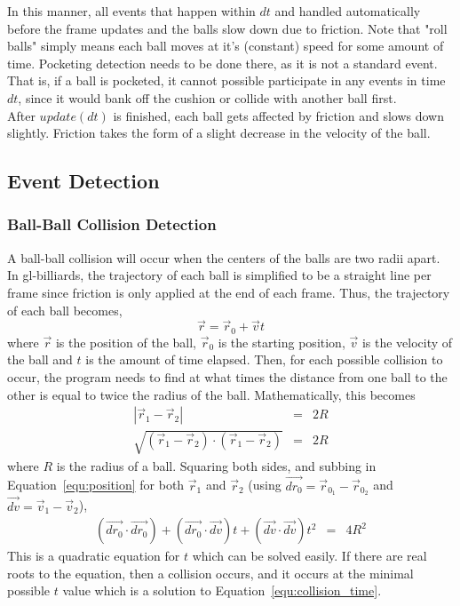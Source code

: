     In this manner, all events that happen within $dt$ and handled automatically before the frame updates and the balls slow
    down due to friction. Note that "roll balls" simply means each ball moves at it's (constant) speed for some amount of time. Pocketing
    detection needs to be done there, as it is not a standard event. That is, if a ball is pocketed, it cannot possible participate
    in any events in time $dt$, since it would bank off the cushion or collide with another ball first. \\
    After $update(dt)$ is finished, each ball gets affected by friction and slows down slightly. Friction takes the form of a
    slight decrease in the velocity of the ball. 
    
    \subsection{Event Detection}
        \subsubsection{Ball-Ball Collision Detection}
        A ball-ball collision will occur when the centers of the balls are two radii apart. In gl-billiards, the trajectory
        of each ball is simplified to be a straight line per frame since friction is only applied at the end of each frame.
        Thus, the trajectory of each ball becomes,
        \begin{equation}
            \vec r = \vec r_0 + \vec v t
            \label{equ:position}
        \end{equation}
        where $\vec r$ is the position of the ball, $\vec r_0$ is the starting position, $\vec v$ is the velocity of the ball and
        $t$ is the amount of time elapsed. Then, for each possible collision to occur, the program needs to find at what times the
        distance from one ball to the other is equal to twice the radius of the ball. Mathematically, this becomes
        \begin{eqnarray}
            | \vec r_1 - \vec r_2 | &=& 2 R   \nonumber   \\
            \sqrt{ (\vec r_1 - \vec r_2) \cdot (\vec r_1 - \vec r_2) } &=& 2 R  \nonumber
        \end{eqnarray}
        where $R$ is the radius of a ball. Squaring both sides, and subbing in Equation~\ref{equ:position} for both
        $\vec r_1$ and $\vec r_2$ (using $\vec{dr_0} = \vec r_{0_1} - \vec r_{0_2}$ and $\vec{dv} = \vec v_1 - \vec v_2$),
        \begin{eqnarray}
            (\vec{dr_0} \cdot \vec{dr_0}) + (\vec{dr_0} \cdot \vec{dv}) t + (\vec{dv} \cdot \vec{dv}) t^2 &=& 4 R^2
            \label{equ:collision_time}
        \end{eqnarray}
        This is a quadratic equation for $t$ which can be solved easily. If there are real roots to the equation, then
        a collision occurs, and it occurs at the minimal possible $t$ value which is a solution to Equation~\ref{equ:collision_time}.
        

